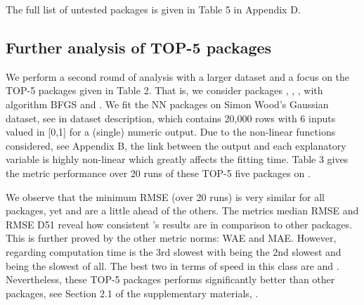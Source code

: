 The full list of untested packages is given in Table 5 in Appendix D.

\hypertarget{further-analysis-of-top-5-packages}{%
\subsection{Further analysis of TOP-5
packages}\label{further-analysis-of-top-5-packages}}

We perform a second round of analysis with a larger dataset and a focus
on the TOP-5 packages given in Table 2. That is, we consider packages
, , ,  with algorithm BFGS
and . We fit the NN packages on Simon Wood's Gaussian
dataset, see  in dataset description, which contains
20,000 rows with 6 inputs valued in {[}0,1{]} for a (single) numeric
output. Due to the non-linear functions considered, see Appendix B, the
link between the output and each explanatory variable is highly
non-linear which greatly affects the fitting time. Table 3 gives the
metric performance over 20 runs of these TOP-5 five packages on
.

We observe that the minimum RMSE (over 20 runs) is very similar for all
packages, yet  and  are a little ahead of the
others. The metrics median RMSE and RMSE D51 reveal how consistent
's results are in comparison to other packages. This is
further proved by the other metric norms: WAE and MAE. However,
regarding computation time  is the 3rd slowest with
 being the 2nd slowest and  being the slowest of
all. The best two in terms of speed in this class are  and
. Nevertheless, these TOP-5 packages performs
significantly better than other packages, see Section 2.1 of the
supplementary materials, \citep{suppl:material:paper}.

